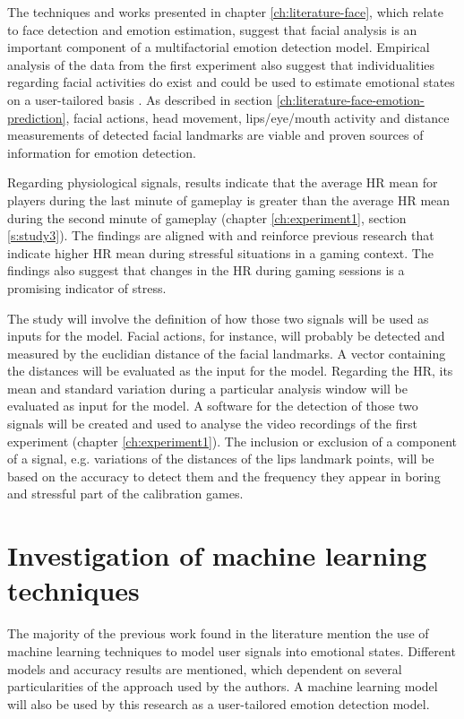 The techniques and works presented in chapter \ref{ch:literature-face}, which relate to face detection and emotion estimation, suggest that facial analysis is an important component of a multifactorial emotion detection model. Empirical analysis of the data from the first experiment also suggest that individualities regarding facial activities do exist and could be used to estimate emotional states on a user-tailored basis \parencite{bevilacqua2016variations}. As described in section \ref{ch:literature-face-emotion-prediction}, facial actions, head movement, lips/eye/mouth activity and distance measurements of detected facial landmarks are viable and proven sources of information for emotion detection.

Regarding physiological signals, results indicate that the average HR mean for players during the last minute of gameplay is greater than the average HR mean during the second minute of gameplay (chapter \ref{ch:experiment1}, section \ref{s:study3}). The findings are aligned with and reinforce previous research that indicate higher HR mean during stressful situations in a gaming context. The findings also suggest that changes in the HR during gaming sessions is a promising indicator of stress.

The study will involve the definition of how those two signals will be used as inputs for the model. Facial actions, for instance, will probably be detected and measured by the euclidian distance of the facial landmarks. A vector containing the distances will be evaluated as the input for the model. Regarding the HR, its mean and standard variation during a particular analysis window will be evaluated as input for the model. A software for the detection of those two signals will be created and used to analyse the video recordings of the first experiment (chapter \ref{ch:experiment1}). The inclusion or exclusion of a component of a signal, e.g. variations of the distances of the lips landmark points, will be based on the accuracy to detect them and the frequency they appear in boring and stressful part of the calibration games.

\section{Investigation of machine learning techniques}
\label{closing:investigation-machine-learning}

The majority of the previous work found in the literature mention the use of machine learning techniques to model user signals into emotional states. Different models and accuracy results are mentioned, which dependent on several particularities of the approach used by the authors. A machine learning model will also be used by this research as a user-tailored emotion detection model.

